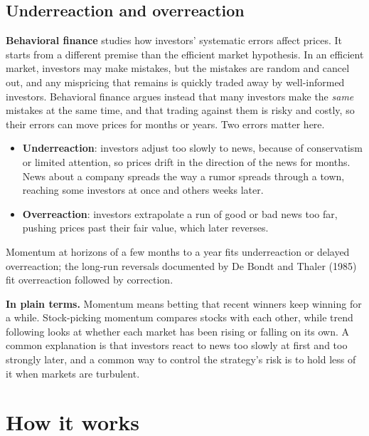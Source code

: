 \subsection{Underreaction and overreaction}
\label{sec:05-behavior}

\textbf{Behavioral finance} studies how investors' systematic errors affect prices. It starts from a different premise than the efficient market hypothesis. In an efficient market, investors may make mistakes, but the mistakes are random and cancel out, and any mispricing that remains is quickly traded away by well-informed investors. Behavioral finance argues instead that many investors make the \emph{same} mistakes at the same time, and that trading against them is risky and costly, so their errors can move prices for months or years. Two errors matter here.

\begin{itemize}
  \item \textbf{Underreaction}: investors adjust too slowly to news, because of conservatism or limited attention, so prices drift in the direction of the news for months. News about a company spreads the way a rumor spreads through a town, reaching some investors at once and others weeks later.
  \item \textbf{Overreaction}: investors extrapolate a run of good or bad news too far, pushing prices past their fair value, which later reverses.
\end{itemize}

Momentum at horizons of a few months to a year fits underreaction or delayed overreaction; the long-run reversals documented by De Bondt and Thaler (1985) fit overreaction followed by correction.

\noindent\textbf{In plain terms.} Momentum means betting that recent winners keep winning for a while. Stock-picking momentum compares stocks with each other, while trend following looks at whether each market has been rising or falling on its own. A common explanation is that investors react to news too slowly at first and too strongly later, and a common way to control the strategy's risk is to hold less of it when markets are turbulent.

\section{How it works}
\label{sec:05-how}

